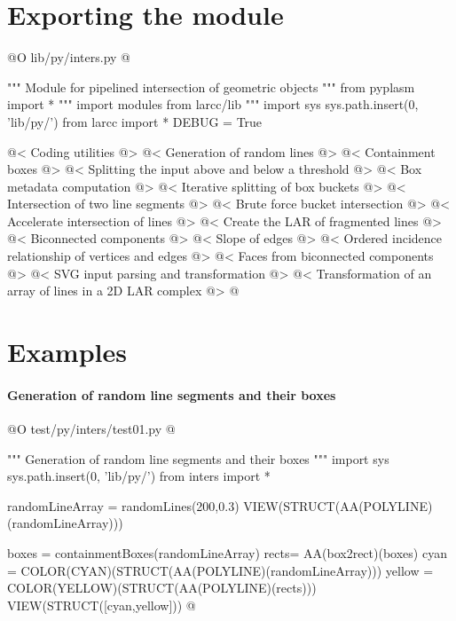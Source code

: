 \documentclass[11pt,oneside]{article}    %
\begin{document}
\section{Exporting the module}

@O lib/py/inters.py
@{""" Module for pipelined intersection of geometric objects """
from pyplasm import *
""" import modules from larcc/lib """
import sys
sys.path.insert(0, 'lib/py/')
from larcc import *
DEBUG = True

@< Coding utilities @>
@< Generation of random lines @>
@< Containment boxes @>
@< Splitting the input above and below a threshold @>
@< Box metadata computation @>
@< Iterative splitting of box buckets @>
@< Intersection of two line segments @>
@< Brute force bucket intersection @>
@< Accelerate intersection of lines @>
@< Create the LAR of fragmented lines @>
@< Biconnected components @>
@< Slope of edges @>
@< Ordered incidence relationship of vertices and edges @>
@< Faces from biconnected components @>
@< SVG input parsing and transformation @>
@< Transformation of an array of lines in a 2D LAR complex @>
@}


\section{Examples}




\paragraph{Generation of random line segments and their boxes}
@O test/py/inters/test01.py
@{""" Generation of random line segments and their boxes """
import sys
sys.path.insert(0, 'lib/py/')
from inters import *

randomLineArray = randomLines(200,0.3)
VIEW(STRUCT(AA(POLYLINE)(randomLineArray)))

boxes = containmentBoxes(randomLineArray)
rects= AA(box2rect)(boxes)
cyan = COLOR(CYAN)(STRUCT(AA(POLYLINE)(randomLineArray)))
yellow = COLOR(YELLOW)(STRUCT(AA(POLYLINE)(rects)))
VIEW(STRUCT([cyan,yellow]))
@}
\end{document}
